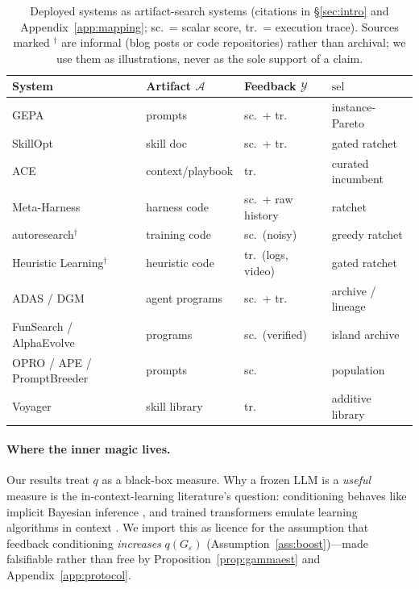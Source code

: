\documentclass{article}
\theoremstyle{plain}
\theoremstyle{definition}
\theoremstyle{remark}
\newcommand{\A}{\mathcal{A}}
\newcommand{\Y}{\mathcal{Y}}
\newcommand{\sel}{\mathrm{sel}}
\newcommand{\eps}{\varepsilon}
\begin{document}
\begin{table}[t]
\caption{Deployed systems as artifact-search systems (citations in \S\ref{sec:intro} and Appendix~\ref{app:mapping}; sc.\ = scalar score, tr.\ = execution trace). Sources marked $^\dagger$ are informal (blog posts or code repositories) rather than archival; we use them as illustrations, never as the sole support of a claim.}
\label{tab:systems}
\vskip 0.05in
\centering
\footnotesize
\begin{tabular}{@{}llll@{}}
\toprule
System & Artifact $\A$ & Feedback $\Y$ & $\sel$ \\
\midrule
GEPA & prompts & sc.\ + tr. & instance-Pareto \\
SkillOpt & skill doc & sc.\ + tr. & gated ratchet \\
ACE & context/playbook & tr. & curated incumbent \\
Meta-Harness & harness code & sc.\ + raw history & ratchet \\
autoresearch$^\dagger$ & training code & sc.\ (noisy) & greedy ratchet \\
Heuristic Learning$^\dagger$ & heuristic code & tr.\ (logs, video) & gated ratchet \\
ADAS / DGM & agent programs & sc.\ + tr. & archive / lineage \\
FunSearch / AlphaEvolve & programs & sc.\ (verified) & island archive \\
OPRO / APE / PromptBreeder & prompts & sc. & population \\
Voyager & skill library & tr. & additive library \\
\bottomrule
\end{tabular}
\vskip -0.1in
\end{table}

\paragraph{Where the inner magic lives.}
Our results treat $q$ as a black-box measure. Why a frozen LLM is a \emph{useful} measure is the in-context-learning literature's question: conditioning behaves like implicit Bayesian inference \citep{xie2022explanation, akyurek2023what}, and trained transformers emulate learning algorithms in context \citep{vonoswald2023transformers, garg2022what}. We import this as licence for the assumption that feedback conditioning \emph{increases} $q(G_\eps)$ (Assumption~\ref{ass:boost})---made falsifiable rather than free by Proposition~\ref{prop:gammaest} and Appendix~\ref{app:protocol}.
\end{document}
